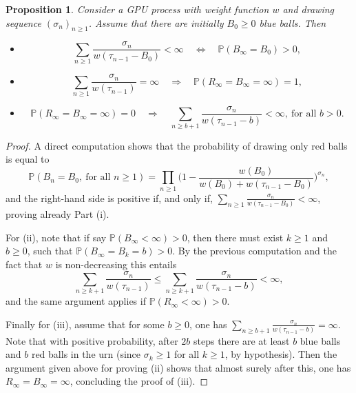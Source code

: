 \documentclass[11pt]{article}
\newtheorem {prop} {Proposition} [section]
\newcommand{\1}{{\text{\Large $\mathfrak 1$}}}
\begin{document}
\begin{prop} \label{prop:GPU}
Consider a GPU process with weight function $w$ and drawing sequence $(\sigma_n)_{n\ge 1}$. Assume that there are initially $B_0\ge 0$ blue balls. Then 
\begin{itemize}
\item[(i)]
$$\sum_{n\ge 1} \frac {\sigma_n}{w(\tau_{n-1}-B_0)} <\infty   \quad  \Longleftrightarrow \quad \mathbb P(B_\infty= B_0 ) >0,$$ 
\item[(ii)] 
$$ \sum_{n\ge 1} \frac {\sigma_n}{w(\tau_{n-1})} =\infty   \quad  \Longrightarrow \quad \mathbb P(R_\infty = B_\infty = \infty) =1,$$ 
\item[(iii)] 
$$\mathbb P(R_\infty = B_\infty = \infty) =0 \quad  \Longrightarrow \quad \sum_{n\ge b+1} \frac {\sigma_n}{w(\tau_{n-1}-b)} <\infty, \ \text{for all }b>0.$$ 
\end{itemize}
\end{prop}
\begin{proof}
A direct computation shows that the probability of drawing only red balls is equal to 
$$\mathbb P(B_n = B_0, \ \text{for all }n\ge 1) = \prod_{n\ge 1} \big(1- \frac{w(B_0)}{w(B_0) + w(\tau_{n-1}-B_0)}\big)^{\sigma_n},$$
and the right-hand side is positive if, and only if, $\sum_{n\ge 1} \frac{\sigma_n}{w(\tau_{n-1}-B_0)}<\infty$, proving already Part (i). 


For (ii), note that if say $\mathbb P(B_\infty<\infty)>0$, then there must exist $k\ge 1$ and $b\ge 0$, such that 
$\mathbb P(B_\infty = B_k =b  ) >0$. By the previous computation and the fact that $w$ is non-decreasing this entails 
$$\sum_{n\ge k+1} \frac {\sigma_n}{w(\tau_{n-1})} \le \sum_{n\ge k+1} \frac {\sigma_n}{w(\tau_{n-1}-b)} <\infty,$$ 
and the same argument applies if $\mathbb P(R_\infty<\infty)>0$. 


Finally for (iii), assume that for some $b\ge 0$, one has $\sum_{n\ge b+1} \frac {\sigma_n}{w(\tau_{n-1}-b)} =\infty$. Note that with positive probability, after $2b$ steps there are at least $b$ blue balls and $b$ red balls in the urn (since $\sigma_k\ge 1$ for all $k\ge 1$, by hypothesis). Then the argument given above for proving (ii) shows that almost surely after this, one has $R_\infty = B_\infty = \infty$, concluding the proof of (iii). 
\end{proof}
\end{document}
